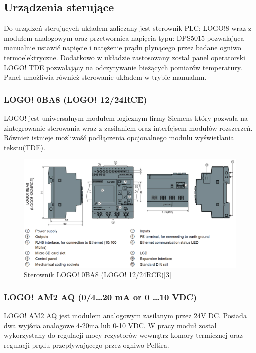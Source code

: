\documentclass[oneside]{mgr}
\begin{document}
\subsection{Urządzenia sterujące}
Do urządzeń sterujących układem zaliczany jest sterownik PLC: LOGO!8 wraz z modułem analogowym oraz przetwornica napięcia typu: DPS5015 pozwalająca manualnie ustawić napięcie i natężenie prądu płynącego przez badane ogniwo termoelektryczne. Dodatkowo w układzie zastosowany został panel operatorski LOGO! TDE pozwalający na odczytywanie bieżących pomiarów temperatury. Panel umożliwia również sterowanie układem w trybie manualnm.

\subsubsection{LOGO! 0BA8 (LOGO! 12/24RCE)}
LOGO! jest uniwersalnym modułem logicznym firmy Siemens który pozwala na zintegrowanie sterowania wraz z zasilaniem oraz interfejsem modułów rozszerzeń. Również istnieje możliwość podłączenia opcjonalnego modułu wyświetlania tekstu(TDE).

\begin{figure}[h!]
    \centering
    \includegraphics[width=\textwidth]{Sterownik_LOGO!.PNG}
    \caption{Sterownik LOGO! 0BA8 (LOGO! 12/24RCE)[3]}
\end{figure}

\subsubsection{LOGO! AM2 AQ (0/4\dots20 mA or 0 \dots 10 VDC)}
LOGO! AM2 AQ jest modułem analogowym zasilanym przez 24V DC. Posiada dwa wyjścia analogowe 4-20ma lub 0-10 VDC. W pracy moduł został wykorzystany do regulacji mocy rezystorów wewnątrz komory termicznej oraz regulacji prądu przepływającego przez ogniwo Peltira.
\end{document}
